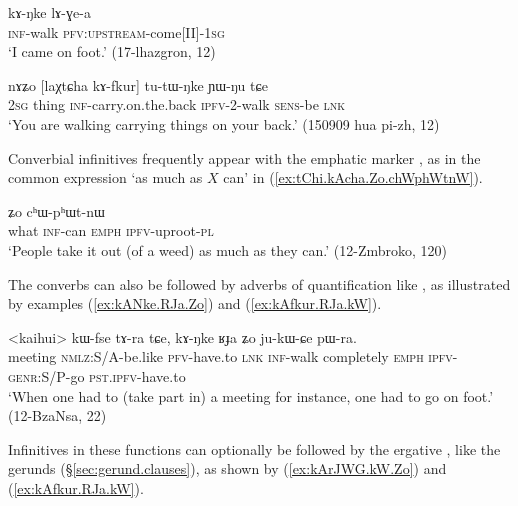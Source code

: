 \begin{exe}
\ex \label{ex:kANke.lAGea}
\gll  kɤ-ŋke lɤ-ɣe-a \\
\textsc{inf}-walk  \textsc{pfv}:\textsc{upstream}-come[II]-\textsc{1sg} \\
\glt `I came on foot.' (17-lhazgron, 12)
\end{exe}

\begin{exe}
\ex \label{ex:kAfkur.tutWNke}
\gll nɤʑo [laχtɕha kɤ-fkur] tu-tɯ-ŋke ɲɯ-ŋu tɕe \\
\textsc{2sg} thing \textsc{inf}-carry.on.the.back \textsc{ipfv}-2-walk \textsc{sens}-be \textsc{lnk} \\
\glt `You are walking carrying things on your back.' (150909 hua pi-zh, 12)
\end{exe}

Converbial infinitives frequently appear with the emphatic marker , as in the common expression  `as much as $X$ can' in (\ref{ex:tChi.kAcha.Zo.chWphWtnW}).

\begin{exe}
\ex \label{ex:tChi.kAcha.Zo.chWphWtnW}
 ʑo cʰɯ-pʰɯt-nɯ \\
what \textsc{inf}-can \textsc{emph}  \textsc{ipfv}-uproot-\textsc{pl} \\
\glt `People take it out (of a weed) as much as they can.' (12-Zmbroko, 120)
\end{exe}

The converbs can also be followed by adverbs of quantification like , as illustrated by examples (\ref{ex:kANke.RJa.Zo}) and (\ref{ex:kAfkur.RJa.kW}).


\begin{exe}
\ex \label{ex:kANke.RJa.Zo}
\gll <kaihui> kɯ-fse tɤ-ra tɕe, kɤ-ŋke ʁɟa ʑo ju-kɯ-ɕe pɯ-ra. \\
meeting \textsc{nmlz}:S/A-be.like \textsc{pfv}-have.to \textsc{lnk} \textsc{inf}-walk completely \textsc{emph} \textsc{ipfv}-\textsc{genr}:S/P-go \textsc{pst}.\textsc{ipfv}-have.to \\
\glt `When one had to (take part in) a meeting for instance, one had to go on foot.' (12-BzaNsa, 22)
\end{exe}

Infinitives in these functions can optionally be followed by the ergative , like the gerunds (§\ref{sec:gerund.clauses}), as shown by (\ref{ex:kArJWG.kW.Zo}) and (\ref{ex:kAfkur.RJa.kW}). 

